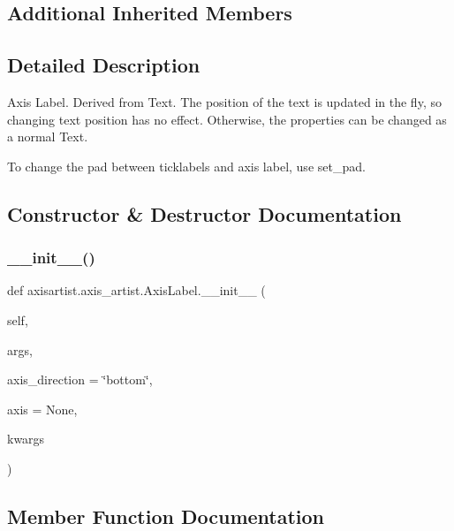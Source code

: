 \subsection*{Additional Inherited Members}


\subsection{Detailed Description}
\begin{DoxyVerb}Axis Label. Derived from Text. The position of the text is updated
in the fly, so changing text position has no effect. Otherwise, the
properties can be changed as a normal Text.

To change the pad between ticklabels and axis label, use set_pad.
\end{DoxyVerb}
 

\subsection{Constructor \& Destructor Documentation}
\mbox{\label{classaxisartist_1_1axis__artist_1_1AxisLabel_a3119889bf0fc09129220db340275dcb3}} 
\subsubsection{\texorpdfstring{\+\_\+\+\_\+init\+\_\+\+\_\+()}{\_\_init\_\_()}}
{\footnotesize\ttfamily def axisartist.\+axis\+\_\+artist.\+Axis\+Label.\+\_\+\+\_\+init\+\_\+\+\_\+ (\begin{DoxyParamCaption}\item[{}]{self,  }\item[{}]{args,  }\item[{}]{axis\+\_\+direction = {\ttfamily \char`\"{}bottom\char`\"{}},  }\item[{}]{axis = {\ttfamily None},  }\item[{}]{kwargs }\end{DoxyParamCaption})}



\subsection{Member Function Documentation}
\mbox{\label{classaxisartist_1_1axis__artist_1_1AxisLabel_a59d2f5f47942900fa1c052c39ef29851}} 

